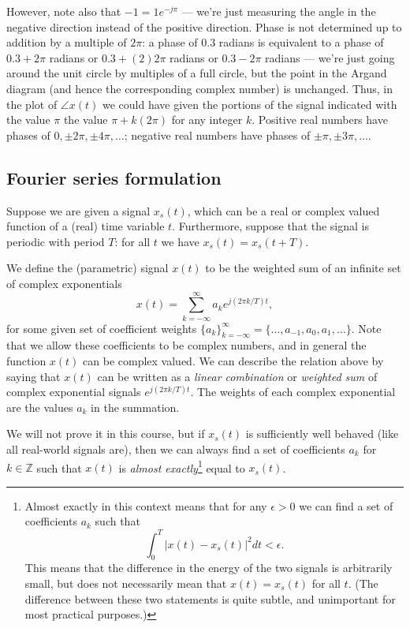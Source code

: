 \documentclass[10pt]{beamer}
\begin{document}
However, note also that $-1 = 1 e^{-j \pi}$ --- we're just measuring the angle in the negative direction instead of the positive direction.  Phase is not determined up to addition by a multiple of $2 \pi$:  a phase of $0.3$ radians is equivalent to a phase of $0.3 + 2 \pi$ radians or $0.3 + (2) 2 \pi$ radians or $0.3 - 2 \pi$ radians --- we're just going around the unit circle by multiples of a full circle, but the point in the Argand diagram (and hence the corresponding complex number) is unchanged.  Thus, in the plot of $\angle x(t)$ we could have given the portions of the signal indicated with the value $\pi$ the value $\pi + k (2 \pi)$ for any integer $k$.  Positive real numbers have phases of $0, \pm 2\pi, \pm 4\pi, \dots$;  negative real numbers have phases of $\pm \pi, \pm 3\pi, \ldots$.

\subsection{Fourier series formulation}

Suppose we are given a signal $x_s(t)$, which can be a real or complex valued function of a (real) time variable $t$. Furthermore, suppose that the signal is periodic with period $T$:  for all $t$ we have $x_s(t) = x_s(t + T)$. 

We define the (parametric) signal $x(t)$ to be the weighted sum of an infinite set of complex exponentials
\begin{equation*}
  x(t) = \sum_{k=-\infty}^\infty a_k e^{j (2\pi k/T) t},
\end{equation*}
for some given set of coefficient weights $\{a_k\}_{k=-\infty}^\infty = \{ \ldots, a_{-1}, a_0, a_1, \ldots \}$.  Note that we allow these coefficients to be complex numbers, and in general the function $x(t)$ can be complex valued.  We can describe the relation above by saying that $x(t)$ can be written as a {\em linear combination} or {\em weighted sum} of complex exponential signals $e^{j (2\pi k/T) t}$.  The weights of each complex exponential are the values $a_k$ in the summation.

We will not prove it in this course, but if $x_s(t)$ is sufficiently well behaved (like all real-world signals are), then we can always find a set of coefficients $a_k$ for $k \in \mathbb{Z}$ such that $x(t)$ is {\em almost exactly}\footnote{Almost exactly in this context means that for any $\epsilon > 0$ we can find a set of coefficients $a_k$ such that 
\begin{equation*}
  \int_0^T |x(t) - x_s(t)|^2 dt < \epsilon.
\end{equation*}
This means that the difference in the energy of the two signals is arbitrarily small, but does not necessarily mean that $x(t) = x_s(t)$ for all $t$.  (The difference between these two statements is quite subtle, and unimportant for most practical purposes.)} equal to $x_s(t)$.  
\end{document}
